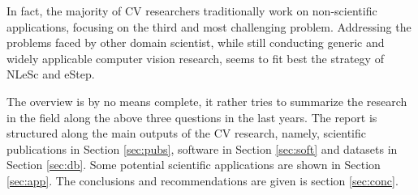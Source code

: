 In fact, the majority of CV researchers traditionally work on non-scientific applications, focusing on the third and most challenging problem. Addressing the problems faced by other domain scientist, while still conducting generic and widely applicable computer vision research, seems to fit best the strategy of NLeSc and eStep. 

The overview is by no means complete, it rather tries to summarize the research in the field along the above three questions in the last years. The report is structured along the main outputs of the CV research, namely, scientific publications in Section \ref{sec:pubs}, software in Section \ref{sec:soft} and datasets in Section \ref{sec:db}. Some potential scientific applications are shown in Section \ref{sec:app}. The conclusions and recommendations are given is section \ref{sec:conc}.